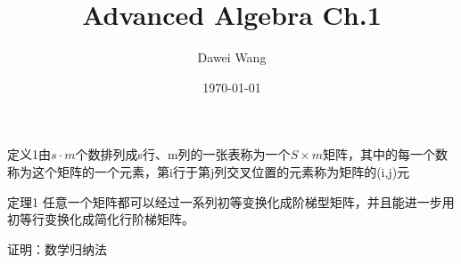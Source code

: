 \documentclass{article}
\title{Advanced Algebra Ch.1}
\author{Dawei Wang}
\date{\today}
\begin{document}
\maketitle
定义1\enspace 由$s\cdot m$个数排列成s行、m列的一张表称为一个$S\times m$矩阵，其中的每一个数称为这个矩阵的一个元素，第i行于第j列交叉位置的元素称为矩阵的(i,j)元

定理1 任意一个矩阵都可以经过一系列初等变换化成阶梯型矩阵，并且能进一步用初等行变换化成简化行阶梯矩阵。

证明：数学归纳法
\end{document}
